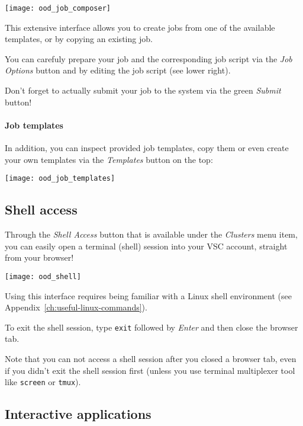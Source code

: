 \begin{center}
    \texttt{[image: ood\_job\_composer]}
\end{center}

This extensive interface allows you to create jobs from one of the available templates,
or by copying an existing job.

You can carefuly prepare your job and the corresponding job script via the \emph{Job Options} button
and by editing the job script (see lower right).

Don't forget to actually submit your job to the system via the green \emph{Submit} button!

\paragraph{Job templates}

In addition, you can inspect provided job templates, copy them or even create your own templates via the \emph{Templates} button on the top:

\begin{center}
    \texttt{[image: ood\_job\_templates]}
\end{center}

\subsection{Shell access}

Through the \emph{Shell Access} button that is available under the \emph{Clusters} menu item,
you can easily open a terminal (shell) session into your VSC account, straight from your browser!

\begin{center}
    \texttt{[image: ood\_shell]}
\end{center}

Using this interface requires being familiar with a Linux shell environment (see Appendix~\ref{ch:useful-linux-commands}).

To exit the shell session, type \lstinline|exit| followed by \emph{Enter} and then close the browser tab.

Note that you can not access a shell session after you closed a browser tab, even if you didn't exit the
shell session first (unless you use terminal multiplexer tool like \lstinline|screen| or \lstinline|tmux|).

\subsection{Interactive applications}

